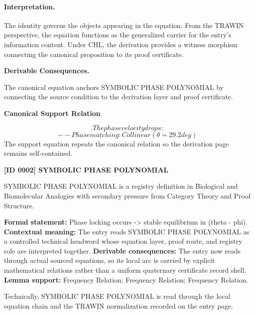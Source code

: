 \paragraph{Interpretation.}
The identity governs the objects appearing in the equation. From the TRAWIN perspective, the equation functions as the generalized carrier for the entry’s information content. Under CHL, the derivation provides a witness morphism connecting the canonical proposition to its proof certificate.

\par\vspace{0.35em}
\noindent\textbf{Derivable Consequences.}\quad
\begingroup
\footnotesize
\raggedright
The canonical equation anchors SYMBOLIC PHASE POLYNOMIAL by connecting the source condition to the derivation layer and proof certificate.
\par\endgroup

\noindent\textbf{Canonical Support Relation}\par
\[
. The phase velocity drops:
\]
\[
-- Phase matching: Collinear (\theta = 29.2 deg )
\]
\noindent The support equation repeats the canonical relation so the derivation page remains self-contained.\par

\clearpage
\noindent\textbf{[ID 0902] SYMBOLIC PHASE POLYNOMIAL}\par
\vspace{0.35em}
\begingroup\small
{}
SYMBOLIC PHASE POLYNOMIAL is a registry definition in Biological and Biomolecular Analogies with secondary pressure from Category Theory and Proof Structure.

\begingroup\footnotesize\setlength{\emergencystretch}{3em}\sloppy
\textbf{Formal statement:} Phase locking occurs -> stable equilibrium in (theta - phi). \textbf{Contextual meaning:} The entry reads SYMBOLIC PHASE POLYNOMIAL as a controlled technical headword whose equation layer, proof route, and registry role are interpreted together. \textbf{Derivable consequences:} The entry now reads through actual sourced equations, so its local arc is carried by explicit mathematical relations rather than a uniform quaternary certificate record shell. \textbf{Lemma support:} Frequency Relation; Frequency Relation; Frequency Relation.\par
\endgroup

Technically, SYMBOLIC PHASE POLYNOMIAL is read through the local equation chain and the TRAWIN normalization recorded on the entry page.

